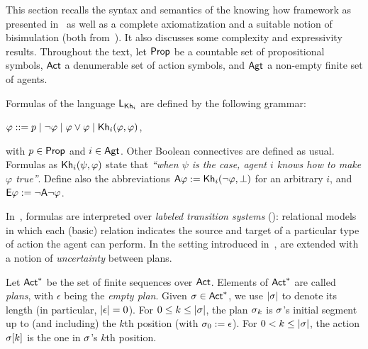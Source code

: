 This section recalls the syntax and semantics of the knowing how framework as presented in~\cite{AFSVQ21} as well as a complete axiomatization and a suitable notion of bisimulation (both from~\cite{AFSVQ23report}). It also discusses some complexity and expressivity results. Throughout the text, let ${\rm \sf Prop}$ be a countable set of propositional symbols, ${\rm \sf Act}$ a denumerable set of action symbols, and ${\rm \sf Agt}$ a non-empty finite set of agents.

\medskip

\begin{definition}\label{def:khsyntax}
Formulas of the language $\mathsf{L}_{{\sf Kh}_i}$ are defined by the following grammar:
\begin{spcenter}
  $\varphi ::= p \mid \neg\varphi \mid \varphi\vee\varphi \mid {\sf Kh}_i(\varphi,\varphi)$,
\end{spcenter}
with $p \in {\rm \sf Prop}$ and $i\in{\rm \sf Agt}$. Other Boolean connectives are defined as usual. Formulas as ${\sf Kh}_i(\psi,\varphi)$ state that \emph{``when $\psi$ is the case, agent $i$ knows how to make $\varphi$ true''}. Define also the abbreviations ${\sf A}\varphi:={\sf Kh}_i(\neg\varphi,\bot)$ for an arbitrary $i$, and ${\sf E}\varphi:=\neg{\sf A}\neg\varphi$.
\end{definition}
\medskip

In~\cite{Wang15lori,Wang2016}, formulas are interpreted
over \emph{labeled transition systems} (\ltss): relational
models in which each (basic) relation indicates the source and target
of a particular type of action the agent can perform.
In the setting introduced in~\cite{AFSVQ21},  are extended with a notion of \emph{uncertainty} between plans.

\medskip

\begin{definition}
Let ${\rm \sf Act}^*$ be the set of finite sequences over ${\rm \sf Act}$. Elements of
${\rm \sf Act}^*$ are called \emph{plans}, with $\epsilon$ being the
\emph{empty plan}. %
Given $\sigma \in {\rm \sf Act}^*$, we use $|{\sigma}|$ to denote its length (in particular, $|{\epsilon}| = 0$). For
$0 \le k \le |{\sigma}|$, the plan $\sigma_k$ is $\sigma$'s initial
segment up to (and including) the $k$th position (with
$\sigma_0 := \epsilon$). For $0 < k \le |{\sigma}|$, the action
$\sigma[k]$ is the one in $\sigma$'s $k$th position.
\end{definition}


